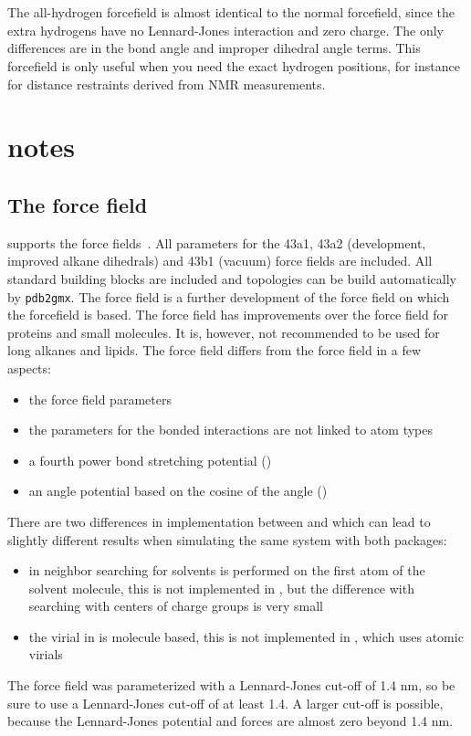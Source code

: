 


\section{}
The {\gromacs} all-hydrogen forcefield is almost identical to the normal
{\gromacs} forcefield, since the extra hydrogens have no Lennard-Jones
interaction and zero charge. The only differences are in the bond angle
and improper dihedral angle terms. This forcefield is only useful when
you need the exact hydrogen positions, for instance for distance
restraints derived from NMR measurements.

\section{ notes}

\subsection{The  force field}
{\gromacs} supports the  force fields~\cite{gromos96}.
All parameters for the 43a1, 43a2 (development, improved alkane
dihedrals) and 43b1 (vacuum) force fields are included.  All standard
building blocks are included and topologies can be build automatically
by {\tt pdb2gmx}.  The  force field is a further
development of the  force field on which the {\gromacs}
forcefield is based. The  force field has improvements
over the {\gromacs} force field for proteins and small molecules.
It is, however, not recommended to be used for long alkanes and
lipids.  The  force field differs from the {\gromacs}
force field in a few aspects:
\begin{itemize}
\item the force field parameters
\item the parameters for the bonded interactions are not linked to atom types
\item a fourth power bond stretching potential ()
\item an angle potential based on the cosine of the angle ()
\end{itemize}
There are two differences in implementation between {\gromacs} and 
which can lead to slightly different results when simulating the same system
with both packages: 
\begin{itemize}
\item in  neighbor searching for solvents is performed on the
first atom of the solvent molecule, this is not implemented in {\gromacs},
but the difference with searching with centers of charge groups is very small
\item the virial in  is molecule based, this is not implemented in
{\gromacs}, which uses atomic virials
\end{itemize}
The  force field was parameterized with a Lennard-Jones cut-off
of 1.4 nm, so be sure to use a Lennard-Jones cut-off of at least 1.4.
A larger cut-off is possible, because the Lennard-Jones potential and forces
are almost zero beyond 1.4 nm.

